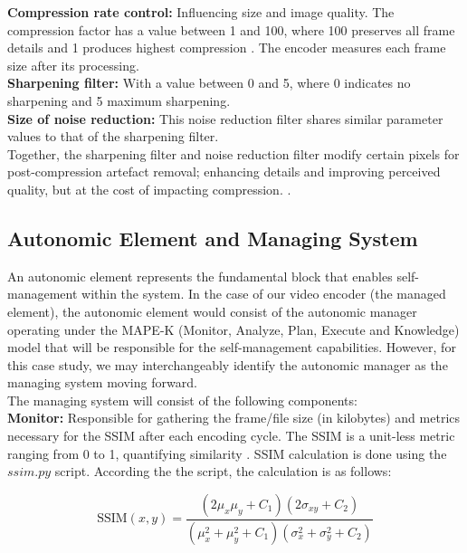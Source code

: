 \documentclass[conference]{IEEEtran}
\begin{document}
\noindent \textbf{Compression rate control:} Influencing size and image quality. The compression factor has a value between 1 and 100, where 100 preserves all frame details and 1 produces highest compression \cite{quiz_pdf}. The encoder measures each frame size after its processing.\\

\noindent \textbf{Sharpening filter:} With a value between 0 and 5, where 0 indicates no sharpening and 5 maximum sharpening.\\

\noindent \textbf{Size of noise reduction:} This noise reduction filter shares similar parameter values to that of the sharpening filter. \cite{DARTS_pdf}\\

\noindent Together, the sharpening filter and noise reduction filter modify certain pixels for post-compression artefact removal; enhancing details and improving perceived quality, but at the cost of impacting compression. \cite{quiz_pdf}.

\subsection{\textbf{Autonomic Element and Managing System}} \label{MS}
An autonomic element represents the fundamental block that enables self-management within the system. In the case of our video encoder (the managed element), the autonomic element would consist of the autonomic manager operating under the MAPE-K (Monitor, Analyze, Plan, Execute and Knowledge) model that will be responsible for the self-management capabilities. However, for this case study, we may interchangeably identify the autonomic manager as the managing system moving forward.\\

The managing system will consist of the following components:\\

\noindent \textbf{Monitor:} Responsible for gathering the frame/file size (in kilobytes) and metrics necessary for the SSIM after each encoding cycle. The SSIM is a unit-less metric ranging from 0 to 1, quantifying similarity \cite{SAVE_pdf}. SSIM calculation is done using the $ssim.py$ script. According the the script, the calculation is as follows:

\[
	\text{SSIM}(x, y) = \frac{ (2\mu_x \mu_y + C_1)(2\sigma_{xy} + C_2) }{ (\mu_x^2 + \mu_y^2 + C_1)(\sigma_x^2 + \sigma_y^2 + C_2) }
\]
\end{document}
